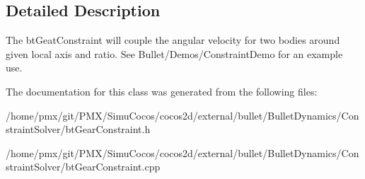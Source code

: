 \subsection{Detailed Description}
The bt\+Geat\+Constraint will couple the angular velocity for two bodies around given local axis and ratio. See Bullet/\+Demos/\+Constraint\+Demo for an example use. 

The documentation for this class was generated from the following files\+:\begin{DoxyCompactItemize}
\item 
/home/pmx/git/\+P\+M\+X/\+Simu\+Cocos/cocos2d/external/bullet/\+Bullet\+Dynamics/\+Constraint\+Solver/bt\+Gear\+Constraint.\+h\item 
/home/pmx/git/\+P\+M\+X/\+Simu\+Cocos/cocos2d/external/bullet/\+Bullet\+Dynamics/\+Constraint\+Solver/bt\+Gear\+Constraint.\+cpp\end{DoxyCompactItemize}
